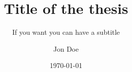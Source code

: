 \titlehead{\centering University of Jon Doe}
\subject{Thesis}
\title{Title of the thesis}
\subtitle{If you want you can have a subtitle}
\author{Jon Doe}
\date{\today}
\publishers{Prof. Dr. rer. LaTeX}
\maketitle